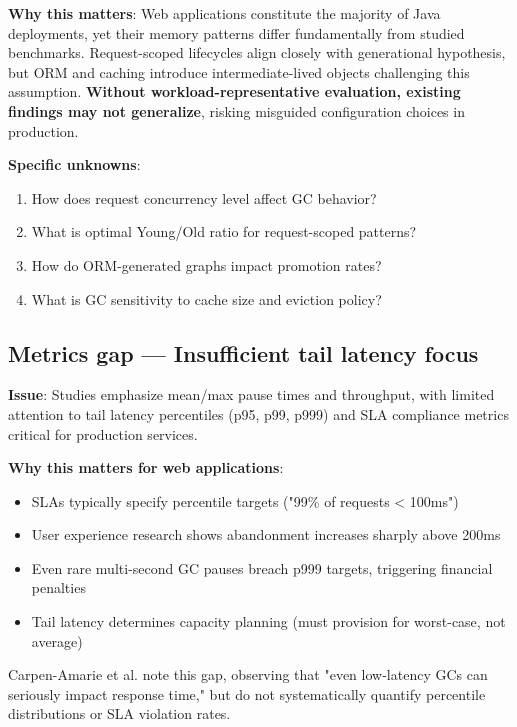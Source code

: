 \textbf{Why this matters}: Web applications constitute the majority of Java deployments, yet their memory patterns differ fundamentally from studied benchmarks. Request-scoped lifecycles align closely with generational hypothesis, but ORM and caching introduce intermediate-lived objects challenging this assumption. \textbf{Without workload-representative evaluation, existing findings may not generalize}, risking misguided configuration choices in production.

\textbf{Specific unknowns}:
\begin{enumerate}
    \item How does request concurrency level affect GC behavior?
    \item What is optimal Young/Old ratio for request-scoped patterns?
    \item How do ORM-generated graphs impact promotion rates?
    \item What is GC sensitivity to cache size and eviction policy?
\end{enumerate}

\subsection{Metrics gap --- Insufficient tail latency focus}
\label{subsec:gap-metrics}

\textbf{Issue}: Studies emphasize mean/max pause times and throughput, with limited attention to tail latency percentiles (p95, p99, p999) and SLA compliance metrics critical for production services.

\textbf{Why this matters for web applications}:
\begin{itemize}
    \item SLAs typically specify percentile targets ("99\% of requests < 100ms")
    \item User experience research shows abandonment increases sharply above 200ms
    \item Even rare multi-second GC pauses breach p999 targets, triggering financial penalties
    \item Tail latency determines capacity planning (must provision for worst-case, not average)
\end{itemize}

Carpen-Amarie et al. \cite{carpen2015performance} note this gap, observing that "even low-latency GCs can seriously impact response time," but do not systematically quantify percentile distributions or SLA violation rates.

